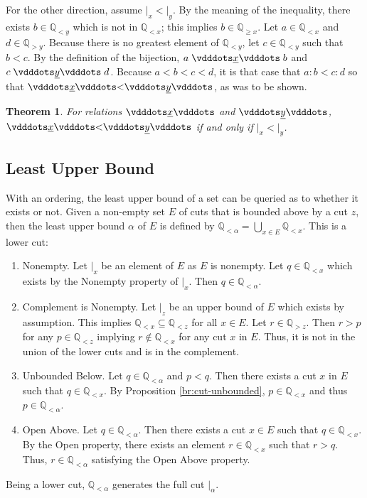 \documentclass{rmj-public}
\newtheorem{theorem}{Theorem}[section]
\newcommand{\qcut}[2][x]{\ensuremath{\mathbb{Q}_{#2 #1}}}
\newcommand{\qlt}[1][x]{\qcut[#1]{<}}
\newcommand{\qgt}[1][x]{\qcut[#1]{>}}
\newcommand{\qgeq}[1][x]{\qcut[#1]{\geq}}
\newcommand{\cut}[1][x]{{\vert}_{#1} }
\newcommand{\yrel}{\xrel[y]}
\begin{document}
For the other direction, assume $\cut < \cut[y]$. By the meaning of the inequality, there exists $b \in \qlt[y]$ which is not in $\qlt$; this implies $b \in \qgeq$. Let $a \in \qlt$ and $d \in \qgt[y]$.  Because there is no greatest element of $\qlt[y]$, let $c\in \qlt[y]$ such that $b < c$. By the definition of the bijection,  $a \xrel b$ and $c \yrel d$. Because $a < b < c < d$, it is that case that $a:b < c:d$ so that $\xrel < \yrel$, as was to be shown. 

\begin{theorem}
For relations $\xrel$ and $\yrel$, $\xrel < \yrel$ if and only if $\cut < \cut[y]$.
\end{theorem}

\subsection{Least Upper Bound}

With an ordering, the least upper bound of a set can be queried as to whether it exists or not. Given a non-empty set $E$ of cuts that is bounded above by a cut $z$, then the least upper bound $\alpha$ of $E$ is defined by $\qlt[\alpha] = \bigcup_{x \in E} \qlt$. This is a lower cut: 
\begin{enumerate}
    \item Nonempty. Let $\cut$ be an element of $E$ as $E$ is nonempty. Let $q \in \qlt$ which exists by the Nonempty property of $\cut$. Then $q \in \qlt[\alpha]$.
    \item Complement is Nonempty. Let $\cut[z]$ be an upper bound of $E$ which exists by assumption. This implies $\qlt \subseteq \qlt[z]$ for all $x \in E$. Let $r \in \qgt[z]$. Then $r > p$ for any $p \in \qlt[z]$ implying $r \notin \qlt[x]$ for any cut $x$ in $E$. Thus, it is not in the union of the lower cuts and is in the complement. 
    \item Unbounded Below. Let $q \in \qlt[\alpha]$ and $p < q$. Then there exists a cut $x$ in $E$ such that $q \in \qlt$. By Proposition \ref{br:cut-unbounded}, $p \in \qlt$ and thus $p \in \qlt[\alpha]$.
    \item Open Above. Let $q \in \qlt[\alpha]$. Then there exists a cut $x \in E$ such that $q \in \qlt$. By the Open property, there exists an element $r \in \qlt$ such that $r > q$. Thus, $r \in \qlt[\alpha]$ satisfying the Open Above property. 
\end{enumerate}
Being a lower cut, $\qlt[\alpha]$ generates the full cut $\cut[\alpha]$.
\end{document}
